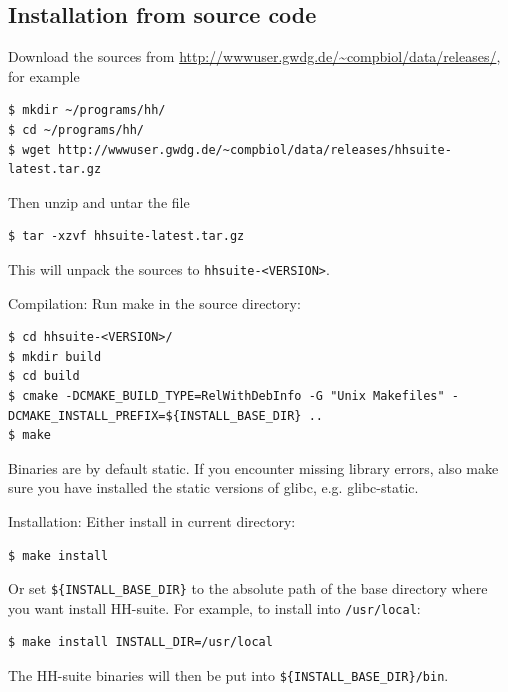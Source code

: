 \documentclass[11pt,a4paper]{article}
\begin{document}
\subsection{Installation from source code} 

\newenvironment{enum}
 {\begin{list}{\arabic{mycounter}.~~}{\usecounter{mycounter} \labelsep=0em =0em \leftmargin=0em \itemindent=0em}}
 {\end{list}}


\begin{enum}

\item Download the sources from \url{http://wwwuser.gwdg.de/~compbiol/data/releases/}, for example
\begin{verbatim}
$ mkdir ~/programs/hh/
$ cd ~/programs/hh/
$ wget http://wwwuser.gwdg.de/~compbiol/data/releases/hhsuite-latest.tar.gz 
\end{verbatim}
\vspace{2mm}


\item Then unzip and untar the file
\begin{verbatim}
$ tar -xzvf hhsuite-latest.tar.gz
\end{verbatim}
This will unpack the sources to \verb`hhsuite-<VERSION>`.
\vspace{2mm}


\item Compilation: Run make in the source directory:
\begin{verbatim}
$ cd hhsuite-<VERSION>/
$ mkdir build
$ cd build
$ cmake -DCMAKE_BUILD_TYPE=RelWithDebInfo -G "Unix Makefiles" -DCMAKE_INSTALL_PREFIX=${INSTALL_BASE_DIR} ..
$ make
\end{verbatim}
Binaries are by default static. If you encounter missing library errors, also make sure you have installed the static versions of glibc, e.g. glibc-static.

\vspace{2mm}

\item Installation: Either install in current directory:
\begin{verbatim}
$ make install
\end{verbatim}
Or set \verb`${INSTALL_BASE_DIR}` to the absolute path of the base directory where you want install HH-suite.
For example, to install into \verb`/usr/local`:
\begin{verbatim}
$ make install INSTALL_DIR=/usr/local
\end{verbatim}
The HH-suite binaries will then be put into \verb`${INSTALL_BASE_DIR}/bin`.
\vspace{2mm}



\end{enum}
\end{document}
